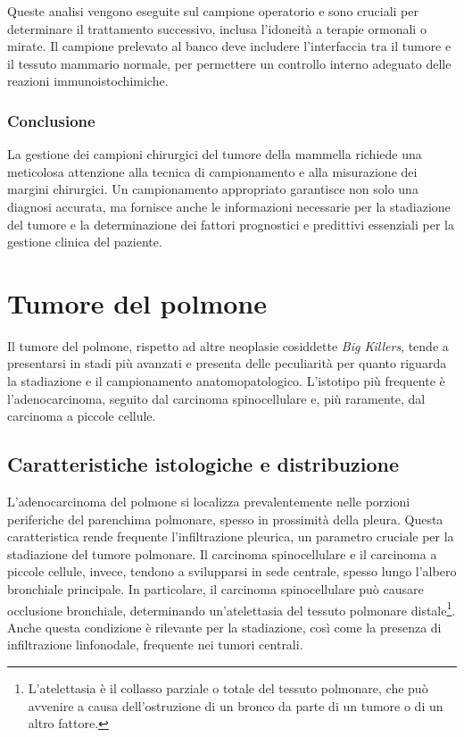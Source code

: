 Queste analisi vengono eseguite sul campione operatorio e sono cruciali per determinare il trattamento successivo, inclusa l’idoneità a terapie ormonali o mirate. Il campione prelevato al banco deve includere l'interfaccia tra il tumore e il tessuto mammario normale, per permettere un controllo interno adeguato delle reazioni immunoistochimiche.

\subsubsection{Conclusione}
La gestione dei campioni chirurgici del tumore della mammella richiede una meticolosa attenzione alla tecnica di campionamento e alla misurazione dei margini chirurgici. Un campionamento appropriato garantisce non solo una diagnosi accurata, ma fornisce anche le informazioni necessarie per la stadiazione del tumore e la determinazione dei fattori prognostici e predittivi essenziali per la gestione clinica del paziente.

\section{Tumore del polmone}
Il tumore del polmone, rispetto ad altre neoplasie cosiddette \textit{Big Killers}, tende a presentarsi in stadi più avanzati e presenta delle peculiarità per quanto riguarda la stadiazione e il campionamento anatomopatologico. L'istotipo più frequente è l'adenocarcinoma, seguito dal carcinoma spinocellulare e, più raramente, dal carcinoma a piccole cellule.

\subsection{Caratteristiche istologiche e distribuzione}
L'adenocarcinoma del polmone si localizza prevalentemente nelle porzioni periferiche del parenchima polmonare, spesso in prossimità della pleura. Questa caratteristica rende frequente l'infiltrazione pleurica, un parametro cruciale per la stadiazione del tumore polmonare. Il carcinoma spinocellulare e il carcinoma a piccole cellule, invece, tendono a svilupparsi in sede centrale, spesso lungo l'albero bronchiale principale. In particolare, il carcinoma spinocellulare può causare occlusione bronchiale, determinando un'atelettasia del tessuto polmonare distale\footnote{L'atelettasia è il collasso parziale o totale del tessuto polmonare, che può avvenire a causa dell'ostruzione di un bronco da parte di un tumore o di un altro fattore.}. Anche questa condizione è rilevante per la stadiazione, così come la presenza di infiltrazione linfonodale, frequente nei tumori centrali.


